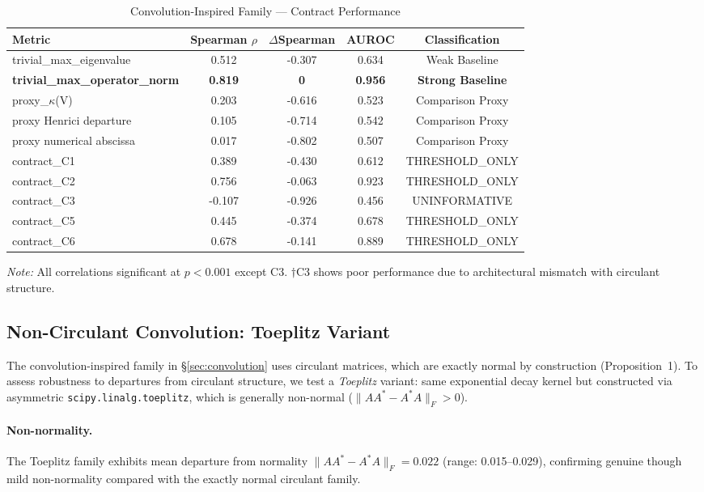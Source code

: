 \documentclass[twoside]{article}
\begin{document}
\begin{table}[H]
\centering
\caption{Convolution-Inspired Family — Contract Performance}
\label{tab:convolution_results}
\begin{tabular}{lcccc}
\toprule
Metric & Spearman $\rho$ & $\Delta$Spearman & AUROC & Classification \\
\midrule
trivial\_max\_eigenvalue & 0.512 & -0.307 & 0.634 & Weak Baseline \\
\textbf{trivial\_max\_operator\_norm} & \textbf{0.819} & \textbf{0} & \textbf{0.956} & \textbf{Strong Baseline} \\
proxy\_$\kappa$(V) & 0.203 & -0.616 & 0.523 & Comparison Proxy \\
proxy Henrici departure & 0.105 & -0.714 & 0.542 & Comparison Proxy \\
proxy numerical abscissa & 0.017 & -0.802 & 0.507 & Comparison Proxy \\
contract\_C1 & 0.389 & -0.430 & 0.612 & THRESHOLD\_ONLY \\
contract\_C2 & 0.756 & -0.063 & 0.923 & THRESHOLD\_ONLY \\
contract\_C3 & -0.107 & -0.926 & 0.456 & UNINFORMATIVE \\
contract\_C5 & 0.445 & -0.374 & 0.678 & THRESHOLD\_ONLY \\
contract\_C6 & 0.678 & -0.141 & 0.889 & THRESHOLD\_ONLY \\
\bottomrule
\end{tabular}
\par\smallskip
{\footnotesize \textit{Note:} All correlations significant at $p < 0.001$
except C3. $\dagger$C3 shows poor performance due to architectural mismatch with circulant structure.}
\end{table}


\subsection{Non-Circulant Convolution: Toeplitz Variant}
\label{sec:toeplitz}

The convolution-inspired family in \S\ref{sec:convolution} uses circulant matrices, which are exactly normal by construction (Proposition~1). To assess robustness to departures from circulant structure, we test a \textit{Toeplitz} variant: same exponential decay kernel but constructed via asymmetric \texttt{scipy.linalg.toeplitz}, which is generally non-normal ($\|AA^*-A^*A\|_F > 0$).

\paragraph{Non-normality.}
The Toeplitz family exhibits mean departure from normality $\|AA^*-A^*A\|_F = 0.022$ (range: 0.015--0.029), confirming genuine though mild non-normality compared with the exactly normal circulant family.
\end{document}

